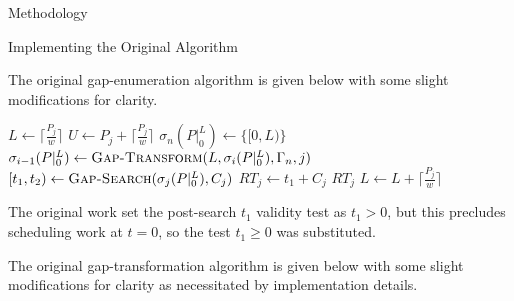 \documentclass{article}
\begin{document}
\begin{section}{Methodology}
  \begin{subsection}{Implementing the Original Algorithm}
    \begin{paragraph}{}
      The original gap-enumeration algorithm is given below with some slight modifications
      for clarity.

    \begin{algorithm}[H]
      \caption{Gap-Enumeration Algorithm\autocite[11]{BelwalCheng}}\label{gapenum1}
      \begin{algorithmic}[1]
          \State $L \gets \lceil\frac{P_{j}}{w}\rceil$
          \State $U \gets P_{j} + \lceil\frac{P_{j}}{w}\rceil$
            \State $\sigma_{n}(P|_{0}^{L}) \gets \{[0,L)\}$
              \State $\sigma_{i-1}(P|_{0}^{L}) \gets \Call{Gap-Transform}{L, \sigma_{i}(P|_{0}^{L}), \Gamma_{n}, j}$
                \State {}
              \EndIf
            \EndFor
            \State $[t_{1},t_{2}) \gets \Call{Gap-Search}{\sigma_{j}(P|_{0}^{L}), C_{j}}$
              \State $RT_{j} \gets t_{1} + C_{j}$
            \EndIf
              \State \Return $RT_{j}$
            \EndIf
            \State $L \gets L + \lceil\frac{P_{j}}{w}\rceil$
          \EndWhile
        \State {}
      \EndFunction
      \end{algorithmic}
    \end{algorithm}

    The original work set the post-search $t_{1}$ validity test as $t_{1} > 0$, but
    this precludes scheduling work at $t = 0$, so the test $t_{1} \geq 0$
    was substituted.
    \end{paragraph}

    \begin{paragraph}{}
      The original gap-transformation algorithm is given below with some slight
      modifications for clarity as necessitated by implementation details.


\end{paragraph}
\end{subsection}
\end{section}
\end{document}
